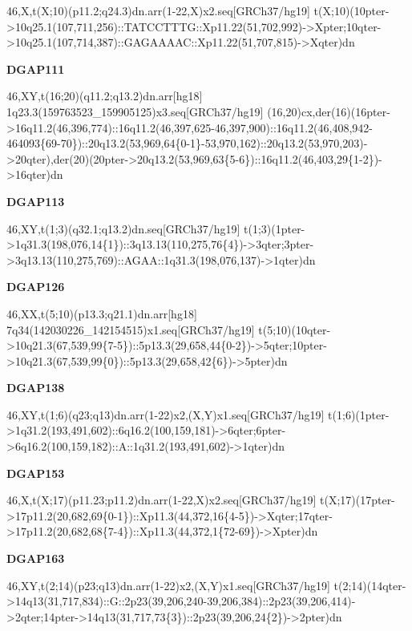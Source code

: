 \documentclass[a4paper,twoside=true,openright,parskip=full,chapterprefix=true,11pt,headings=normal,bibliography=totoc,listof=totoc,titlepage=on,captions=tableabove,draft=false]{scrreprt}
\theoremstyle{definition}
\theoremstyle{definition}
\theoremstyle{definition}
\theoremstyle{remark}
\begin{document}
46,X,t(X;10)(p11.2;q24.3)dn.arr(1-22,X)x2.seq{[}GRCh37/hg19{]}
t(X;10)(10pter-\textgreater{}10q25.1(107,711,256)::TATCCTTTG::Xp11.22(51,702,992)-\textgreater{}Xpter;10qter-\textgreater{}10q25.1(107,714,387)::GAGAAAAC::Xp11.22(51,707,815)-\textgreater{}Xqter)dn

\textbf{DGAP111}

46,XY,t(16;20)(q11.2;q13.2)dn.arr{[}hg18{]}
1q23.3(159763523\_159905125)x3.seq{[}GRCh37/hg19{]}
(16,20)cx,der(16)(16pter-\textgreater{}16q11.2(46,396,774)::16q11.2(46,397,625-46,397,900)::16q11.2(46,408,942-464093\{69-70\})::20q13.2(53,969,64\{0-1\}-53,970,162)::20q13.2(53,970,203)-\textgreater{}20qter),der(20)(20pter-\textgreater{}20q13.2(53,969,63\{5-6\})::16q11.2(46,403,29\{1-2\})-\textgreater{}16qter)dn

\textbf{DGAP113}

46,XY,t(1;3)(q32.1;q13.2)dn.seq{[}GRCh37/hg19{]}
t(1;3)(1pter-\textgreater{}1q31.3(198,076,14\{1\})::3q13.13(110,275,76\{4\})-\textgreater{}3qter;3pter-\textgreater{}3q13.13(110,275,769)::AGAA::1q31.3(198,076,137)-\textgreater{}1qter)dn

\textbf{DGAP126}

46,XX,t(5;10)(p13.3;q21.1)dn.arr{[}hg18{]}
7q34(142030226\_142154515)x1.seq{[}GRCh37/hg19{]}
t(5;10)(10qter-\textgreater{}10q21.3(67,539,99\{7-5\})::5p13.3(29,658,44\{0-2\})-\textgreater{}5qter;10pter-\textgreater{}10q21.3(67,539,99\{0\})::5p13.3(29,658,42\{6\})-\textgreater{}5pter)dn

\textbf{DGAP138}

46,XY,t(1;6)(q23;q13)dn.arr(1-22)x2,(X,Y)x1.seq{[}GRCh37/hg19{]}
t(1;6)(1pter-\textgreater{}1q31.2(193,491,602)::6q16.2(100,159,181)-\textgreater{}6qter;6pter-\textgreater{}6q16.2(100,159,182)::A::1q31.2(193,491,602)-\textgreater{}1qter)dn

\textbf{DGAP153}

46,X,t(X;17)(p11.23;p11.2)dn.arr(1-22,X)x2.seq{[}GRCh37/hg19{]}
t(X;17)(17pter-\textgreater{}17p11.2(20,682,69\{0-1\})::Xp11.3(44,372,16\{4-5\})-\textgreater{}Xqter;17qter-\textgreater{}17p11.2(20,682,68\{7-4\})::Xp11.3(44,372,1\{72-69\})-\textgreater{}Xpter)dn

\textbf{DGAP163}

46,XY,t(2;14)(p23;q13)dn.arr(1-22)x2,(X,Y)x1.seq{[}GRCh37/hg19{]}
t(2;14)(14qter-\textgreater{}14q13(31,717,834)::G::2p23(39,206,240-39,206,384)::2p23(39,206,414)-\textgreater{}2qter;14pter-\textgreater{}14q13(31,717,73\{3\})::2p23(39,206,24\{2\})-\textgreater{}2pter)dn
\end{document}
